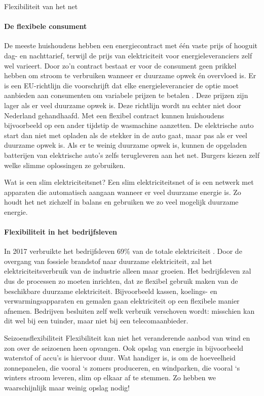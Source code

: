 \begin{voorstel}{Flexibiliteit van het net}
\begin{multicols*}{2}
\begin{overwegingen}
\paragraph{De flexibele consument}
De meeste huishoudens hebben een energiecontract met één vaste prijs of hooguit dag- en nachttarief, terwijl de prijs van elektriciteit voor energieleveranciers zelf wel varieert. Door zo'n contract bestaat er voor de consument geen prikkel hebben om stroom te verbruiken wanneer er duurzame opwek én overvloed is. Er is een EU-richtlijn die voorschrijft dat elke energieleverancier de optie moet aanbieden aan consumenten om variabele prijzen te betalen \parencite{europees_parlement_notitle_nodate}. Deze prijzen zijn lager als er veel duurzame opwek is. Deze richtlijn wordt nu echter niet door Nederland gehandhaafd. Met een flexibel contract kunnen huishoudens bijvoorbeeld op een ander tijdstip de wasmachine aanzetten. De elektrische auto start dan niet met opladen als de stekker in de auto gaat, maar pas als er veel duurzame opwek is. Als er te weinig duurzame opwek is, kunnen de opgeladen batterijen van elektrische auto’s zelfs terugleveren aan het net. Burgers kiezen zelf welke slimme oplossingen ze gebruiken.

\begin{infobox}{Wat is een slim elektriciteitsnet?}
Een slim elektriciteitsnet of  is een netwerk met apparaten die automatisch aangaan wanneer er veel duurzame energie is. Zo houdt het net zichzelf in balans en gebruiken we zo veel mogelijk duurzame energie.
\end{infobox}

\paragraph{Flexibiliteit in het bedrijfsleven}
In 2017 verbruikte het bedrijfsleven 69\% van de totale elektriciteit \parencite{centraal_bureau_voor_de_statistiek_statline_nodate}. Door de overgang van fossiele brandstof naar duurzame elektriciteit, zal het elektriciteitsverbruik van de industrie alleen maar groeien. Het bedrijfsleven zal dus de processen zo moeten inrichten, dat ze flexibel gebruik maken van de beschikbare duurzame elektriciteit. Bijvoorbeeld kassen, koelings- en verwarmingsapparaten en gemalen gaan elektriciteit op een flexibele manier afnemen. Bedrijven besluiten zelf welk verbruik verschoven wordt: misschien kan dit wel bij een tuinder, maar niet bij een telecomaanbieder.

\begin{infobox}{Seizoensflexibiliteit}
Flexibiliteit kan niet het veranderende aanbod van wind en zon over de seizoenen heen opvangen. Ook opslag van energie in bijvoorbeeld waterstof of accu’s is hiervoor duur. Wat handiger is, is om de hoeveelheid zonnepanelen, die vooral ‘s zomers produceren, en windparken, die vooral ‘s winters stroom leveren, slim op elkaar af te stemmen. Zo hebben we waarschijnlijk maar weinig opslag nodig!
\end{infobox}


\end{overwegingen}
\end{multicols*}
\end{voorstel}
